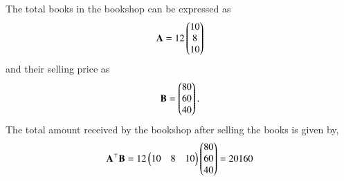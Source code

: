 The total books in the bookshop can be expressed as 
\begin{align}
    \mathbf{A} = 12 \begin{pmatrix}10 \\ 8 \\ 10\end{pmatrix}
\end{align}
and their selling price as
%
\begin{align}
    \mathbf{B} = \begin{pmatrix}80 \\ 60 \\ 40\end{pmatrix}.
\end{align}
The total amount received by the bookshop after selling the books is given by,
\begin{align}
    \mathbf{A}^{\top}\mathbf{B} = 12 \begin{pmatrix}10 & 8 & 10\end{pmatrix}\begin{pmatrix}80 \\ 60 \\ 40\end{pmatrix}
    =20160
\end{align}